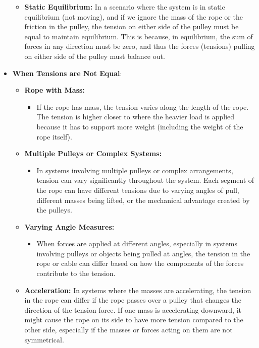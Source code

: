 \documentclass{report}
\begin{document}
\begin{itemize}
\begin{itemize}
                \item \textbf{Static Equilibrium:} In a scenario where the system is in static equilibrium (not moving), and if we ignore the mass of the rope or the friction in the pulley, the tension on either side of the pulley must be equal to maintain equilibrium. This is because, in equilibrium, the sum of forces in any direction must be zero, and thus the forces (tensions) pulling on either side of the pulley must balance out.
            \end{itemize}
        \item \textbf{When Tensions are Not Equal}:
            \begin{itemize}
                \item \textbf{Rope with Mass:}
                    \begin{itemize}
                        \item If the rope has mass, the tension varies along the length of the rope. The tension is higher closer to where the heavier load is applied because it has to support more weight (including the weight of the rope itself).
                    \end{itemize}
                \item \textbf{Multiple Pulleys or Complex Systems:}
                    \begin{itemize}
                        \item In systems involving multiple pulleys or complex arrangements, tension can vary significantly throughout the system. Each segment of the rope can have different tensions due to varying angles of pull, different masses being lifted, or the mechanical advantage created by the pulleys. 
                    \end{itemize}
                \item \textbf{Varying Angle Measures:}
                    \begin{itemize}
                        \item When forces are applied at different angles, especially in systems involving pulleys or objects being pulled at angles, the tension in the rope or cable can differ based on how the components of the forces contribute to the tension.
                    \end{itemize}
                \item \textbf{Acceleration:} In systems where the masses are accelerating, the tension in the rope can differ if the rope passes over a pulley that changes the direction of the tension force. If one mass is accelerating downward, it might cause the rope on its side to have more tension compared to the other side, especially if the masses or forces acting on them are not symmetrical.

\end{itemize}
\end{itemize}
\end{document}
